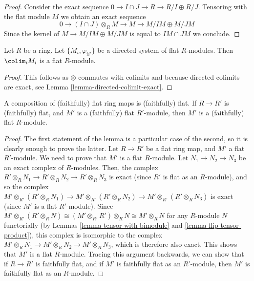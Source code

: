 \begin{proof}
Consider the exact sequence $0 \to I \cap J \to R \to R/I \oplus R/J$.
Tensoring with the flat module $M$ we obtain an exact sequence
$$
0 \to (I \cap J) \otimes_R M \to M \to M/IM \oplus M/JM
$$
Since the kernel of $M \to M/IM \oplus M/JM$ is equal to
$IM \cap JM$ we conclude.
\end{proof}

\begin{lemma}
\label{lemma-colimit-flat}
Let $R$ be a ring. Let $\{M_i, \varphi_{ii'}\}$ be a directed system of
flat $R$-modules. Then $\colim_i M_i$ is a flat $R$-module.
\end{lemma}

\begin{proof}
This follows as $\otimes$ commutes with colimits and because
directed colimits are exact, see
Lemma \ref{lemma-directed-colimit-exact}.
\end{proof}

\begin{lemma}
\label{lemma-composition-flat}
A composition of (faithfully) flat ring maps is
(faithfully) flat.
If $R \to R'$ is (faithfully) flat, and $M'$ is a
(faithfully) flat $R'$-module, then $M'$ is a
(faithfully) flat $R$-module.
\end{lemma}

\begin{proof}
The first statement of the lemma is a particular case of the
second, so it is clearly enough to prove the latter. Let
$R \to R'$ be a flat ring map, and $M'$ a flat $R'$-module.
We need to prove that $M'$ is a flat $R$-module. Let
$N_1 \to N_2 \to N_3$ be an exact complex of $R$-modules.
Then, the complex $R' \otimes_R N_1 \to
R' \otimes_R N_2 \to R' \otimes_R N_3$ is exact (since $R'$
is flat as an $R$-module), and so the complex
$M' \otimes_{R'} \left(R' \otimes_R N_1\right)
\to M' \otimes_{R'} \left(R' \otimes_R N_2\right)
\to M' \otimes_{R'} \left(R' \otimes_R N_3\right)$ is
exact (since $M'$ is a flat $R'$-module). Since
$M' \otimes_{R'} \left(R' \otimes_R N\right)
\cong \left(M' \otimes_{R'} R'\right) \otimes_R N
\cong M' \otimes_R N$ for any $R$-module $N$ functorially
(by Lemmas \ref{lemma-tensor-with-bimodule} and
\ref{lemma-flip-tensor-product}), this complex is isomorphic
to the complex
$M' \otimes_R N_1 \to M' \otimes_R N_2 \to M' \otimes_R N_3$,
which is therefore also exact. This shows that $M'$ is a flat
$R$-module. Tracing this argument backwards, we can show
that if $R \to R'$ is faithfully flat, and if $M'$ is
faithfully flat as an $R'$-module, then $M'$ is faithfully
flat as an $R$-module.
\end{proof}

